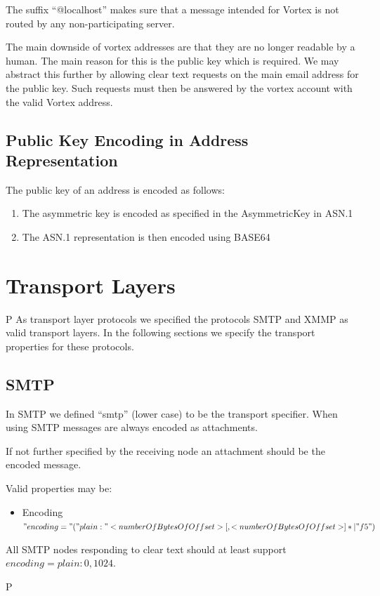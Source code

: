 The suffix ``@localhost'' makes sure that a message intended for Vortex is not routed by any non-participating server.

The main downside of vortex addresses are that they are no longer readable by a human. The main reason for this is the public key which is required. We may abstract this further by allowing clear text requests on the main email address for the public key. Such requests must then be answered by the vortex account with the valid Vortex address.

\subsection{Public Key Encoding in Address Representation}
The public key of an address is encoded as follows:
\begin{enumerate}
	\item The asymmetric key is encoded as specified in the AsymmetricKey in ASN.1
	\item The ASN.1 representation is then encoded using BASE64
\end{enumerate}	

\section{Transport Layers}                                          P
As transport layer protocols we specified the protocols SMTP and XMMP as valid transport layers. In the following sections we specify the transport properties for these protocols.

\subsection{SMTP}
In SMTP we defined ``smtp'' (lower case) to be the transport specifier. When using SMTP messages are always encoded as attachments. 

If not further specified by the receiving node an attachment should be the encoded message. 

Valid properties may be:
\begin{itemize}
	\item Encoding $"encoding="("plain:"<numberOfBytesOfOffset>[,<numberOfBytesOfOffset>]*|"f5")$
\end{itemize}

All SMTP nodes responding to clear text should at least support $encoding=plain:0,1024$.

               P

